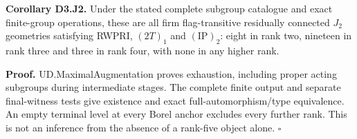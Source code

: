 \textbf{Corollary D3.J2.} Under the stated complete subgroup catalogue
and exact finite-group operations, these are all firm flag-transitive
residually connected \(J_2\) geometries satisfying RWPRI, \((2T)_1\) and
\((\mathrm{IP})_2\): eight in rank two, nineteen in rank three and three
in rank four, with none in any higher rank.

\textbf{Proof.} UD.MaximalAugmentation proves exhaustion, including
proper acting subgroups during intermediate stages. The complete finite
output and separate final-witness tests give existence and exact
full-automorphism/type equivalence. An empty terminal level at every
Borel anchor excludes every further rank. This is not an inference from
the absence of a rank-five object alone. \(\square\)
